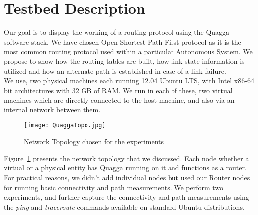 \documentclass{article}
\begin{document}
\clearpage
\section{Testbed Description}
Our goal is to display the working of a routing protocol using the Quagga software stack.
We have chosen Open-Shortest-Path-First protocol as it is the most common routing protocol used
within a particular Autonomous System. We propose to show how the routing tables are built, 
how link-state information is utilized and how an alternate path is established in case of a link failure.\\
We use, two physical machines each running 12.04 Ubuntu LTS, with Intel x86-64 bit architectures with
32 GB of RAM. We run in each of these, two virtual machines which are directly connected to the host machine,
and also via an internal network between them.\\
\begin{figure}[ht!]
  \centering
  \texttt{[image: QuaggaTopo.jpg]}
  \caption{Network Topology chosen for the experiments}
  \label{fig:networktopo}
\end{figure}
Figure~\ref{fig:networktopo} presents the network topology that we discussed. Each node whether a virtual or a physical
entity has Quagga running on it and functions as a router. For practical reasons, we didn't add individual nodes
but used our Router nodes for running basic connectivity and path measurements. We perform two experiments, and
further capture the connectivity and path measurements using the \textit{ping} and \textit{traceroute} commands 
available on standard Ubuntu distributions.
\end{document}
